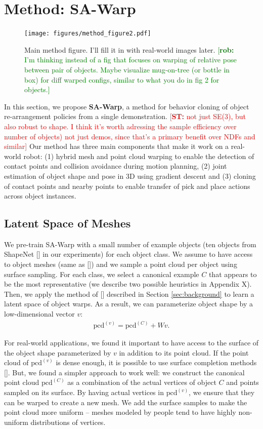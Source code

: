 \documentclass{article}
\newcommand{\rob}[1]{\textcolor{green}{[\textbf{rob:} #1]}}
\newcommand{\rst}
[1]{\textcolor{red}
{[\textbf{ST:} #1]}}
\newcommand{\pcx}[1]{\mathrm{pcd}^{(#1)}}
\newcommand{\pcc}{\pcx{C}}
\begin{document}
\section{Method: SA-Warp}

\begin{figure}
    \centering
    \texttt{[image: figures/method\_figure2.pdf]}
    \caption{Main method figure. I'll fill it in with real-world images later. \rob{I'm thinking instead of a fig that focuses on warping of relative pose between pair of objects. Maybe visualize mug-on-tree (or bottle in box) for diff warped configs, similar to what you do in fig 2 for objects.}}
    \label{fig:method}
\end{figure}

In this section, we propose \textbf{SA-Warp}, a method for behavior cloning of object re-arrangement policies from a single demonstration. \rst{not just SE(3), but also robust to shape. I think it's worth adressing the sample efficiency over number of objects) not just demos, since that's a primary benefit over NDFs and similar} Our method has three main components that make it work on a real-world robot: (1) hybrid mesh and point cloud warping to enable the detection of contact points and collision avoidance during motion planning, (2) joint estimation of object shape and pose in 3D using gradient descent and (3) cloning of contact points and nearby points to enable transfer of pick and place actions across object instances.

\subsection{Latent Space of Meshes}
\label{sec:methods:mesh}

We pre-train SA-Warp with a small number of example objects (ten objects from ShapeNet [] in our experiments) for each object class. We assume to have access to object meshes (same as []) and we sample a point cloud per object using surface sampling. For each class, we select a canonical example $C$ that appears to be the most representative (we describe two possible heuristics in Appendix X). Then, we apply the method of [] described in Section \ref{sec:background} to learn a latent space of object warps. As a result, we can parameterize object shape by a low-dimensional vector $v$:
\begin{align}
    \pcx{v} = \pcc + W v. \tag{3}
\end{align}

For real-world applications, we found it important to have access to the surface of the object shape parameterized by $v$ in addition to its point cloud. If the point cloud of $\pcx{v}$ is dense enough, it is possible to use surface completion methods []. But, we found a simpler approach to work well: we construct the canonical point cloud $\pcc$ as a combination of the actual vertices of object $C$ and points sampled on its surface. By having actual vertices in $\pcx{v}$, we ensure that they can be warped to create a new mesh. We add the surface samples to make the point cloud more uniform -- meshes modeled by people tend to have highly non-uniform distributions of vertices.
\end{document}
